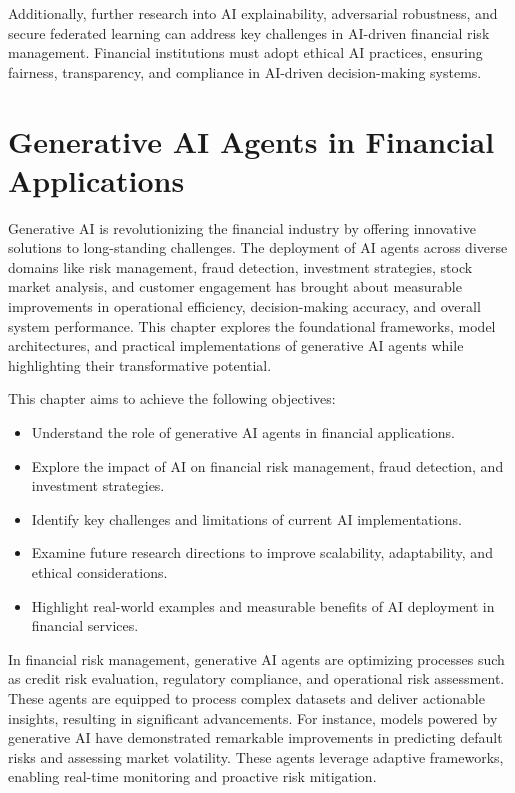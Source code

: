 \documentclass[a4paper,12pt]{scrbook}
\begin{document}
	Additionally, further research into AI explainability, adversarial robustness, and secure federated learning can address key challenges in AI-driven financial risk management. Financial institutions must adopt ethical AI practices, ensuring fairness, transparency, and compliance in AI-driven decision-making systems.
	
	
	
	\chapter{Generative AI Agents in Financial Applications}
	
	Generative AI is revolutionizing the financial industry by offering innovative solutions to long-standing challenges. The deployment of AI agents across diverse domains like risk management, fraud detection, investment strategies, stock market analysis, and customer engagement has brought about measurable improvements in operational efficiency, decision-making accuracy, and overall system performance. This chapter explores the foundational frameworks, model architectures, and practical implementations of generative AI agents while highlighting their transformative potential.
	
	
	This chapter aims to achieve the following objectives:
	
	\begin{itemize}
		\item Understand the role of generative AI agents in financial applications.
		\item Explore the impact of AI on financial risk management, fraud detection, and investment strategies.
		\item Identify key challenges and limitations of current AI implementations.
		\item Examine future research directions to improve scalability, adaptability, and ethical considerations.
		\item Highlight real-world examples and measurable benefits of AI deployment in financial services.
	\end{itemize}
	
	
	In financial risk management, generative AI agents are optimizing processes such as credit risk evaluation, regulatory compliance, and operational risk assessment. These agents are equipped to process complex datasets and deliver actionable insights, resulting in significant advancements. For instance, models powered by generative AI have demonstrated remarkable improvements in predicting default risks and assessing market volatility. These agents leverage adaptive frameworks, enabling real-time monitoring and proactive risk mitigation.
	
\end{document}
